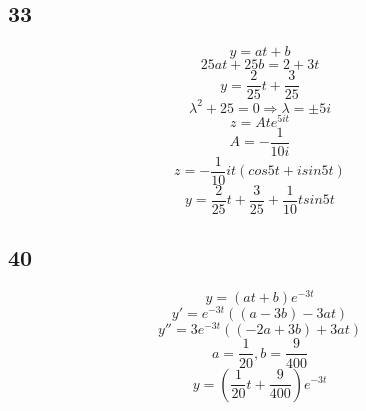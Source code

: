 \documentclass[12pt, a4paper]{IEEEtran}
\begin{document}
    \subsection*{33}
    $$y=at+b$$
    $$25at+25b=2+3t$$
    $$y=\frac{2}{25}t+\frac{3}{25}$$
    $$\lambda^2+25=0\Rightarrow \lambda=\pm 5i$$
    $$z=Ate^{5it}$$
    $$A=-\frac{1}{10i}$$
    $$z=-\frac{1}{10}it(cos5t+isin5t)$$
    $$y=\frac{2}{25}t+\frac{3}{25}+\frac{1}{10}tsin5t$$

    \subsection*{40}
    $$y=(at+b)e^{-3t}$$
    $$y'=e^{-3t}((a-3b)-3at)$$
    $$y''=3e^{-3t}((-2a+3b)+3at)$$
    $$a=\frac{1}{20}, b=\frac{9}{400}$$
    $$y=(\frac{1}{20}t+\frac{9}{400})e^{-3t}$$
    
\end{document}
